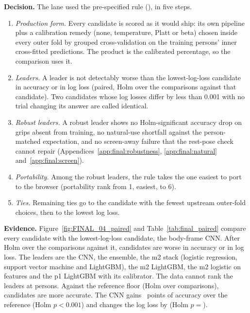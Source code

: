 \textbf{Decision.}
The lane used the pre-specified rule (), in five steps.
\begin{enumerate}[nosep]
  \item \emph{Production form.} Every candidate is scored as it would ship: its own pipeline plus a calibration remedy (none, temperature, Platt or beta) chosen inside every outer fold by grouped cross-validation on the training persons' inner cross-fitted predictions. The product is the calibrated percentage, so the comparison uses it.
  \item \emph{Leaders.} A leader is not detectably worse than the lowest-log-loss candidate in accuracy or in log loss (paired, Holm over the comparisons against that candidate). Two candidates whose log losses differ by less than 0.001 with no trial changing its answer are called identical.
  \item \emph{Robust leaders.} A robust leader shows no Holm-significant accuracy drop on grips absent from training, no natural-use shortfall against the person-matched expectation, and no screen-away failure that the rest-pose check cannot repair (Appendices~\ref{app:final:robustness}, \ref{app:final:natural} and~\ref{app:final:screen}).
  \item \emph{Portability.} Among the robust leaders, the rule takes the one easiest to port to the browser (portability rank from 1, easiest, to 6).
  \item \emph{Ties.} Remaining ties go to the candidate with the fewest upstream outer-fold choices, then to the lowest log loss.
\end{enumerate}

\textbf{Evidence.}
Figure~\ref{fig:FINAL_04_paired} and Table~\ref{tab:final_paired} compare every candidate with the lowest-log-loss candidate, the body-frame CNN.
After Holm over the  comparisons against it,  candidates are worse in accuracy or in log loss.
The  leaders are the CNN, the ensemble, the m2 stack (logistic regression, support vector machine and LightGBM), the m2 LightGBM, the m2 logistic on  features and the p1 LightGBM with its calibrator.
The data cannot rank the leaders at  persons.
Against the reference floor (Holm over  comparisons),  candidates are more accurate.
The CNN gains ~points of accuracy over the reference (Holm $p < 0.001$) and changes the log loss by  (Holm $p = {}$).

